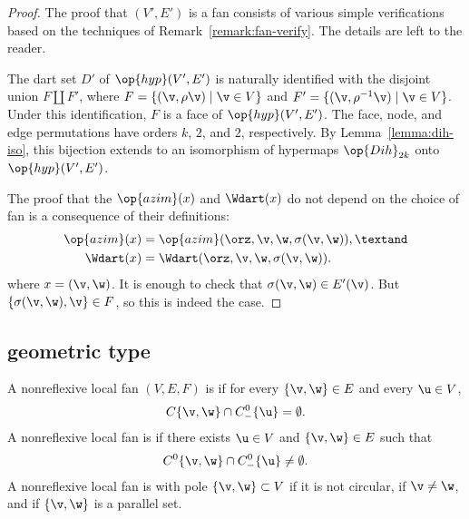 \begin{proof}
The proof that $(V',E')$ is a fan consists of various simple
verifications based on the techniques of
Remark~\ref{remark:fan-verify}.  The details are left to the reader.

The dart set $D'$ of $\op{hyp}(V',E')$ is naturally identified with
the disjoint union $F\coprod F'$, where $F = \{(\v,\rho\v) \mid \v\in
V\}$ and $F'=\{(\v,\rho^{-1}\v) \mid \v\in V\}$.  Under this
identification, $F$ is a face of $\op{hyp}(V',E')$.  The face, node,
and edge permutations have orders $k$, $2$, and $2$, respectively.  By
Lemma~\ref{lemma:dih-iso}, this bijection extends to an isomorphism of
hypermaps $\op{Dih}_{2k}$ onto $\op{hyp}(V',E')$.

The proof that the $\op{azim}(x)$ and $\Wdart(x)$ do not depend on the
choice of fan is a consequence of their definitions:
\begin{align*}
\op{azim}(x) &= \op{azim}(\orz,\v,\w,\sigma(\v,\w)),\textand \\
\Wdart(x) &= \Wdart(\orz,\v,\w,\sigma(\v,\w)).\\
\end{align*}
where $x = (\v,\w)$.  It is enough to check that $\sigma(\v,\w)\in
E'(\v)$.  But $\{\sigma(\v,\w),\v\}\in F$, so this is indeed the case.
\end{proof}



\subsection{geometric type}\label{sec:types}

\begin{definition}
A nonreflexive local fan $(V,E,F)$ is   if for every $\{\v,\w\}\in E$
and every $\u\in V$, 
\[ 
C\{\v,\w\}\cap C^0_-\{\u\} = \emptyset.
\] 
A nonreflexive local fan is   if there exists $\u\in V$ and
$\{\v,\w\}\in E$ such that
\[ 
C^0\{\v,\w\}\cap C^0_-\{\u\}\ne \emptyset.
\] 
A nonreflexive local fan is  with pole $\{\v,\w\} \subset V$ if it is not
circular, if $\v\ne\w$, and if $\{\v,\w\}$ is a parallel set.
\end{definition}
%
%
%


